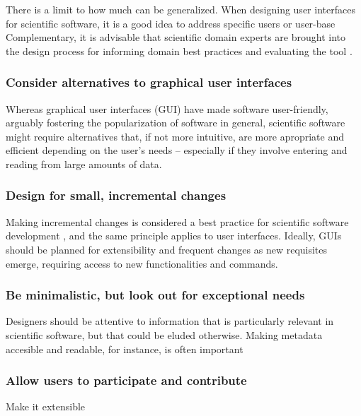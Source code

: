 There is a limit to how much can be generalized. When designing user interfaces for scientific software, it is a good idea to address specific users or user-base \cite {Javahery:2004; DeRoure:2009} Complementary, it is advisable that scientific domain experts are brought into the design process for  informing domain best practices \cite{Schraefel:2004,  DeMatos:2013} and evaluating the tool \cite{Keefe:2010}.


\subsubsection{Consider alternatives to graphical user interfaces}

Whereas graphical user interfaces (GUI) have made software user-friendly, arguably fostering the popularization of software in general, scientific software might require alternatives that, if not more intuitive, are more apropriate and efficient depending on the user's needs – especially if they involve entering and reading from large amounts of data.  

\subsubsection{Design for small, incremental changes}
Making incremental changes is considered a best practice for scientific software development  \cite{bestprSC}, and the same principle applies to user interfaces. Ideally, GUIs should be planned for extensibility and frequent changes as new requisites emerge, requiring access to new functionalities and commands. 

\subsubsection{Be minimalistic, but look out for exceptional needs}

Designers should be attentive to information that is particularly relevant in scientific software, but that could be eluded otherwise. Making metadata accesible and readable, for instance, is often important \cite{Talbott:2005, Baxter:2006; Macaulay:2009, Keefe:2010, DeMatos:2013, bestprSC, Thomer:2016}


\subsubsection{Allow users to participate and contribute} Make it extensible

